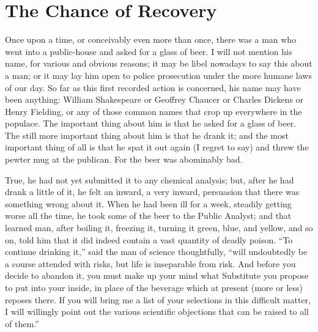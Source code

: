 \documentclass{book}
\begin{document}
\chapter{The Chance of Recovery}
\label{chapter-3}
Once upon a time, or conceivably even more than once, there was a man who went into a public-house and asked for a glass of beer. I will not mention his name, for various and obvious reasons; it may be libel nowadays to say this about a man; or it may lay him open to police prosecution under the more humane laws of our day. So far as this first recorded action is concerned, his name may have been anything: William Shakespeare or Geoffrey Chaucer or Charles Dickens or Henry Fielding, or any of those common names that crop up everywhere in the populace. The important thing about him is that he asked for a glass of beer. The still more important thing about him is that he drank it; and the most important thing of all is that he spat it out again (I regret to say) and threw the pewter mug at the publican. For the beer was abominably bad.

True, he had not yet submitted it to any chemical analysis; but, after he had drank a little of it, he felt an inward, a very inward, persuasion that there was something wrong about it. When he had been ill for a week, steadily getting worse all the time, he took some of the beer to the Public Analyst; and that learned man, after boiling it, freezing it, turning it green, blue, and yellow, and so on, told him that it did indeed contain a vast quantity of deadly poison. “To continue drinking it,” said the man of science thoughtfully, “will undoubtedly be a course attended with risks, but life is inseparable from risk. And before you decide to abandon it, you must make up your mind what Substitute you propose to put into your inside, in place of the beverage which at present (more or less) reposes there. If you will bring me a list of your selections in this difficult matter, I will willingly point out the various scientific objections that can be raised to all of them.”
\end{document}
